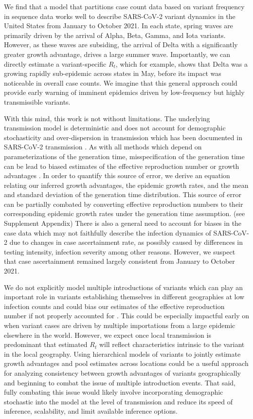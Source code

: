 \documentclass[11pt,oneside,letterpaper]{article}
\begin{document}
We find that a model that partitions case count data based on variant frequency in sequence data works well to describe SARS-CoV-2 variant dynamics in the United States from January to October 2021.
In each state, spring waves are primarily driven by the arrival of Alpha, Beta, Gamma, and Iota variants.
However, as these waves are subsiding, the arrival of Delta with a significantly greater growth advantage, drives a large summer wave.
Importantly, we can directly estimate a variant-specific $R_{t}$, which for example, shows that Delta was a growing rapidly sub-epidemic across states in May, before its impact was noticeable in overall case counts.
We imagine that this general approach could provide early warning of imminent epidemics driven by low-frequency but highly transmissible variants.

With this mind, this work is not without limitations.
The underlying transmission model is deterministic and does not account for demographic stochasticity and over-dispersion in transmission which has been documented in SARS-CoV-2 transmission \cite{Wong29416}.
As with all methods which depend on parameterizations of the generation time, misspecification of the generation time can be lead to biased estimates of the effective reproduction number or growth advantages \cite{Gostic2020}.
In order to quantify this source of error, we derive an equation relating our inferred growth advantages, the epidemic growth rates, and the mean and standard deviation of the generation time distribution.
This source of error can be partially combated by converting effective reproduction numbers to their corresponding epidemic growth rates under the generation time assumption. (see Supplement Appendix)
There is also a general need to account for biases in the case data which may not faithfully describe the infection dynamics of SARS-CoV-2 due to changes in case ascertainment rate, as possibly caused by differences in testing intensity, infection severity among other reasons.
However, we suspect that case ascertainment remained largely consistent from January to October 2021.

We do not explicitly model multiple introductions of variants which can play an important role in variants establishing themselves in different geographies at low infection counts and could bias our estimates of the effective reproduction number if not properly accounted for \cite{Cori2013, MullerWagner2021}.
This could be especially impactful early on when variant cases are driven by multiple importations from a large epidemic elsewhere in the world.
However, we expect once local transmission is predominant that estimated $R_{t}$ will reflect characteristics intrinsic to the variant in the local geography.
Using hierarchical models of variants to jointly estimate growth advantages and pool estimates across locations could be a useful approach for analyzing consistency between growth advantages of variants geographically and beginning to combat the issue of multiple introduction events.
That said, fully combating this issue would likely involve incorporating demographic stochastic into the model at the level of transmission and reduce its speed of inference, scalability, and limit available inference options.
\end{document}
